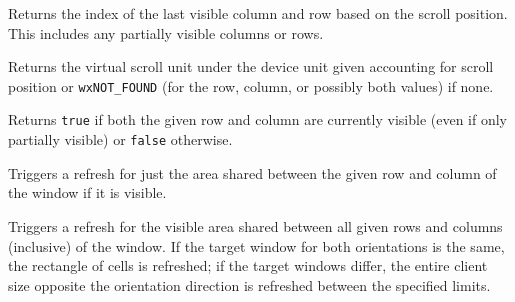
Returns the index of the last visible column and row based on the scroll
position. This includes any partially visible columns or rows.


\label{wxvarhvscrollhelpervirtualhittest}



Returns the virtual scroll unit under the device unit given accounting for
scroll position or {\tt wxNOT\_FOUND} (for the row, column, or possibly both
values) if none.


\label{wxvarhvscrollhelperisvisible}



Returns {\tt true} if both the given row and column are currently visible
(even if only partially visible) or {\tt false} otherwise.


\label{wxvarhvscrollhelperrefreshrowcolumn}



Triggers a refresh for just the area shared between the given row and column
of the window if it is visible.


\label{wxvarhvscrollhelperrefreshrowscolumns}



Triggers a refresh for the visible area shared between all given rows and
columns (inclusive) of the window. If the target window for both orientations
is the same, the rectangle of cells is refreshed; if the target windows
differ, the entire client size opposite the orientation direction is
refreshed between the specified limits.


